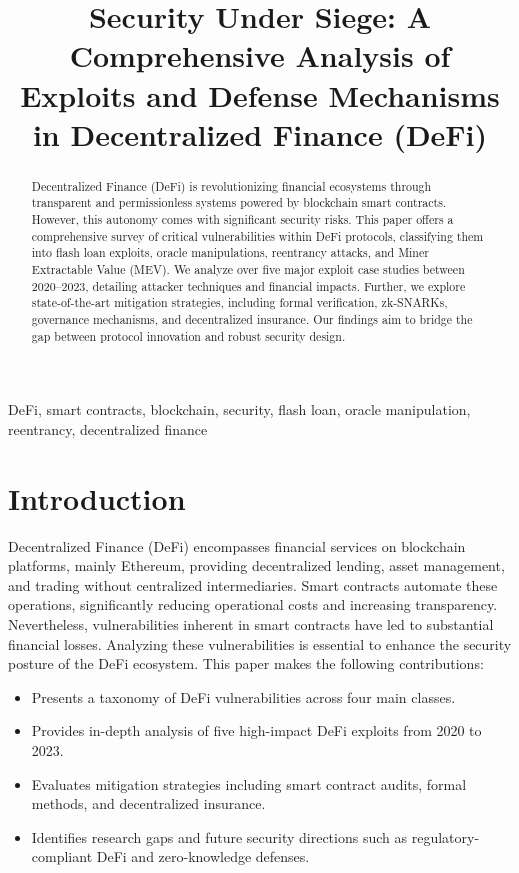 \documentclass[conference]{IEEEtran}
\title{Security Under Siege: A Comprehensive Analysis of Exploits and Defense Mechanisms in Decentralized Finance (DeFi)}
\author{\IEEEauthorblockN{ZAKI ABADI BIN PUTEH and MARSHITAH BINTI MAZLAN}
\IEEEauthorblockA{Department of Information Systems\\
Hanyang University\\
zakotto@hanyang.ac.kr, marshieys@hanyang.ac.kr}}
\begin{document}
\maketitle

\begin{abstract}
Decentralized Finance (DeFi) is revolutionizing financial ecosystems through transparent and permissionless systems powered by blockchain smart contracts. However, this autonomy comes with significant security risks. This paper offers a comprehensive survey of critical vulnerabilities within DeFi protocols, classifying them into flash loan exploits, oracle manipulations, reentrancy attacks, and Miner Extractable Value (MEV). We analyze over five major exploit case studies between 2020–2023, detailing attacker techniques and financial impacts. Further, we explore state-of-the-art mitigation strategies, including formal verification, zk-SNARKs, governance mechanisms, and decentralized insurance. Our findings aim to bridge the gap between protocol innovation and robust security design.
\end{abstract}

\begin{IEEEkeywords}
DeFi, smart contracts, blockchain, security, flash loan, oracle manipulation, reentrancy, decentralized finance
\end{IEEEkeywords}

\section{Introduction}
Decentralized Finance (DeFi) encompasses financial services on blockchain platforms, mainly Ethereum, providing decentralized lending, asset management, and trading without centralized intermediaries. Smart contracts automate these operations, significantly reducing operational costs and increasing transparency. Nevertheless, vulnerabilities inherent in smart contracts have led to substantial financial losses. Analyzing these vulnerabilities is essential to enhance the security posture of the DeFi ecosystem.
This paper makes the following contributions:
\begin{itemize}
  \item Presents a taxonomy of DeFi vulnerabilities across four main classes.
  \item Provides in-depth analysis of five high-impact DeFi exploits from 2020 to 2023.
  \item Evaluates mitigation strategies including smart contract audits, formal methods, and decentralized insurance.
  \item Identifies research gaps and future security directions such as regulatory-compliant DeFi and zero-knowledge defenses.
\end{itemize}
\end{document}
